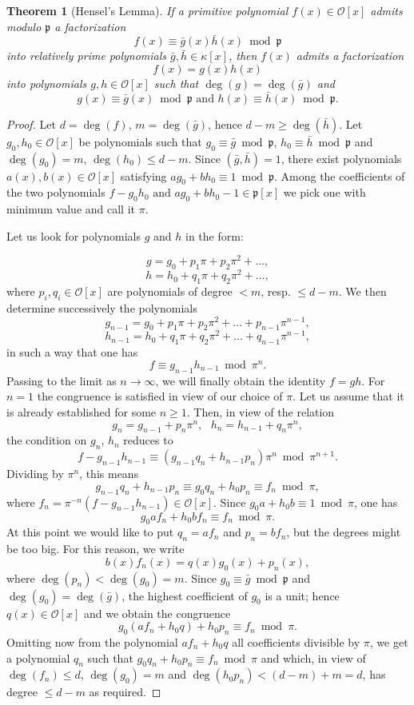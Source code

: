 \documentclass{article}
\newtheorem{theorem}{Theorem}
\begin{document}
\begin{theorem}[Hensel's Lemma]\label{hensel}
If a primitive polynomial $f(x) \in \mathcal{O}[x]$ admits modulo $\mathfrak{p}$ a factorization
$$f(x) \equiv \bar{g}(x)\bar{h}(x) \bmod{\mathfrak{p}}$$
into relatively prime polynomials $\bar{g},\bar{h} \in \kappa[x]$, then $f(x)$ admits a factorization
$$f(x) = g(x)h(x)$$
into polynomials $g,h \in \mathcal{O}[x]$ such that $\deg(g) = \deg(\bar{g})$ and
$$g(x) \equiv \bar{g}(x) \bmod{\mathfrak{p}} \mbox{ and } h(x) \equiv \bar{h}(x) \bmod{\mathfrak{p}}.$$
\end{theorem}
\begin{proof}
Let $d = \deg(f)$, $m = \deg(\bar{g})$, hence $d - m \ge \deg(\bar{h})$. Let $g_0, h_0 \in \mathcal{O}[x]$ be polynomials such that $g_0 \equiv \bar{g} \bmod \mathfrak{p}$, $h_0 \equiv \bar{h} \bmod \mathfrak{p}$ and $\deg(g_0) = m$, $\deg(h_0) \le d-m$. Since $(
\bar{g}, \bar{h}) = 1$, there exist polynomials $a(x), b(x) \in \mathcal{O}[x]$ satisfying $ag_0 + bh_0 \equiv 1 \bmod \mathfrak{p}$.  Among the coefficients of the two polynomials $f-g_0h_0 \mbox{ and } ag_0 + bh_0 - 1 \in \mathfrak{p}[x]$ we pick one with minimum value and call it $\pi$.

Let us look for polynomials $g$ and $h$ in the form:

$$g = g_0 + p_1\pi + p_2\pi^2 + \ldots,$$
$$h = h_0 + q_1\pi + q_2\pi^2 + \ldots,$$
where $p_i, q_i \in \mathcal{O}[x]$ are polynomials of degree $< m$, resp. $\le d - m$.  We then determine successively the polynomials
$$g_{n-1} = g_0 + p_1\pi + p_2\pi^2 + \ldots + p_{n-1}\pi^{n-1},$$
$$h_{n-1} = h_0 + q_1\pi + q_2\pi^2 + \ldots + q_{n-1}\pi^{n-1},$$
in such a way that one has
$$f \equiv g_{n-1}h_{n-1} \bmod \pi^n.$$
Passing to the limit as $n \to \infty$, we will finally obtain the identity $f = gh$.  For $n=1$ the congruence is satisfied in view of our choice of $\pi$.  Let us assume that it is already established for some $n \ge 1$.  Then, in view of the relation
$$g_n = g_{n-1} + p_n\pi^n, \mbox{ } h_n = h_{n-1} + q_n\pi^n,$$
the condition on $g_n$, $h_n$ reduces to
$$f - g_{n-1}h_{n-1} \equiv (g_{n-1}q_n + h_{n-1}p_n)\pi^n \bmod \pi^{n+1}.$$
Dividing by $\pi^n$, this means
$$g_{n-1}q_n + h_{n-1}p_n \equiv g_0q_n + h_0p_n \equiv f_n \bmod \pi,$$
where $f_n = \pi^{-n}(f - g_{n-1}h_{n-1}) \in \mathcal{O}[x]$.  Since $g_0a + h_0b \equiv 1 \bmod \pi$, one has
$$g_0af_n + h_0bf_n \equiv f_n \bmod \pi.$$
At this point we would like to put $q_n = af_n$ and $p_n = bf_n$, but the degrees might be too big.  For this reason, we write
$$b(x)f_n(x) = q(x)g_0(x) + p_n(x),$$
where $\deg(p_n) < \deg(g_0) = m$.  Since $g_0 \equiv \bar{g} \bmod \mathfrak{p}$ and $\deg(g_0) = \deg(\bar{g})$, the highest coefficient of $g_0$ is a unit; hence $q(x) \in \mathcal{O}[x]$ and we obtain the congruence
$$g_0(af_n + h_0q) + h_0p_n \equiv f_n \bmod \pi.$$
Omitting now from the polynomial $af_n + h_0q$ all coefficients divisible by $\pi$, we get a polynomial $q_n$ such that $g_0q_n + h_0p_n \equiv f_n \bmod \pi$ and which, in view of $\deg(f_n) \le d$, $\deg(g_0) = m$ and $\deg(h_0p_n) < (d-m) + m = d$, has degree $\le d-m$ as required.
\end{proof}
\end{document}

